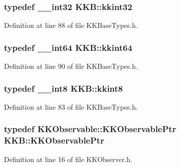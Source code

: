 \subsubsection[{\texorpdfstring{kkint32}{kkint32}}]{\setlength{\rightskip}{0pt plus 5cm}typedef \+\_\+\+\_\+int32 {\bf K\+K\+B\+::kkint32}}\hypertarget{namespace_k_k_b_a8fa4952cc84fda1de4bec1fbdd8d5b1b}{}\label{namespace_k_k_b_a8fa4952cc84fda1de4bec1fbdd8d5b1b}


Definition at line 88 of file K\+K\+Base\+Types.\+h.

\subsubsection[{\texorpdfstring{kkint64}{kkint64}}]{\setlength{\rightskip}{0pt plus 5cm}typedef \+\_\+\+\_\+int64 {\bf K\+K\+B\+::kkint64}}\hypertarget{namespace_k_k_b_aa3486b1c5ea9162b3b020c69f72826eb}{}\label{namespace_k_k_b_aa3486b1c5ea9162b3b020c69f72826eb}


Definition at line 90 of file K\+K\+Base\+Types.\+h.

\subsubsection[{\texorpdfstring{kkint8}{kkint8}}]{\setlength{\rightskip}{0pt plus 5cm}typedef \+\_\+\+\_\+int8 {\bf K\+K\+B\+::kkint8}}\hypertarget{namespace_k_k_b_af3afe438e33eee4e63728d59803872c7}{}\label{namespace_k_k_b_af3afe438e33eee4e63728d59803872c7}


Definition at line 83 of file K\+K\+Base\+Types.\+h.

\subsubsection[{\texorpdfstring{K\+K\+Observable\+Ptr}{KKObservablePtr}}]{\setlength{\rightskip}{0pt plus 5cm}typedef {\bf K\+K\+Observable\+::\+K\+K\+Observable\+Ptr} {\bf K\+K\+B\+::\+K\+K\+Observable\+Ptr}}\hypertarget{namespace_k_k_b_ad2874a3aec87b033137ef07aef832c93}{}\label{namespace_k_k_b_ad2874a3aec87b033137ef07aef832c93}


Definition at line 16 of file K\+K\+Observer.\+h.

